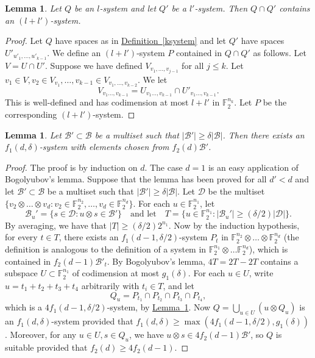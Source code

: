 \documentclass[11pt]{article}
\numberwithin{equation}{section}
\newtheorem{lemma}[theorem]{Lemma}
\theoremstyle{definition}
\theoremstyle{plain}
\newcommand{\expref}[2]{\hyperref[#2]{#1~\ref{#2}}}
\newcommand\F{\mathbb{F}}
\renewcommand\d{\delta}
\newcommand \cB{\mathcal B}
\newcommand \cD{\mathcal D}
\newcommand \s{\subset}
\begin{document}
\begin{lemma} \label{intersect}
	Let $Q$ be an $l$-system and let $Q'$ be a $l'$-system. Then $Q\cap Q'$ contains an $(l+l')$-system.
\end{lemma}

\begin{proof}
	Let $Q$ have spaces as in \expref{Definition}{ksystem} and let $Q'$ have spaces $U'_{u'_1,\dots,u'_{k-1}}$.
	We define an $(l+l')$-system $P$ contained in $Q\cap Q'$ as follows. Let $V=U\cap U'$. Suppose we have defined $V_{v_1,\dots,v_{j-1}}$ for all $j\leq k$. Let $v_1\in V,v_2\in V_{v_1},\dots,v_{k-1}\in V_{v_1,\dots,v_{k-2}}$.  We let \[
          V_{v_1\dots,v_{k-1}}=U_{v_1\dots,v_{k-1}}\cap U'_{v_1\dots,v_{k-1}}.
        \]
        This is well-defined and has codimension at most $l+l'$ in
        $\F_2^{n_k}$. Let $P$ be the corresponding $(l+l')$-system.
\end{proof}

\begin{lemma} \label{findsystem}
	Let $\cB'\subset \cB$ be a multiset such that $|\cB'|\geq \delta |\cB|$. Then there exists an $f_1(d,\d)$-system with elements chosen from $f_2(d)\cB'$.
\end{lemma}

\begin{proof}
  The proof is by induction on $d$. The case $d=1$ is an easy application of Bogolyubov's lemma. Suppose that the lemma has been proved for all $d'<d$ and let $\cB'\subset \cB$ be a multiset such that $|\cB'|\geq \delta |\cB|$. Let $\cD$ be the multiset $\{v_2\otimes\dots\otimes v_d: v_2\in \F_2^{n_2},\dots,v_d\in \F_2^{n_d}\}$. For each $u\in \F_2^{n_1}$, let \[
    \cB_u'=\{s\in \cD: u\otimes s\in \cB'\}\quad\text{and let}\quad T=\{u\in \F_2^{n_1}: |\cB_u'|\geq ({\delta}/{2})|\cD| \}.
  \]
  By averaging, we have that $|T|\geq ({\delta}/{2}) 2^{n_1}$. Now by
  the induction hypothesis, for every $t\in T$, there exists an
  $f_1(d-1,\d/2)$-system $P_t$ in
  $\F_2^{n_2}\otimes \dots \otimes \F_2^{n_d}$ (the definition is
  analogous to the definition of a system in
  $\F_2^{n_1}\otimes \dots \F_2^{n_d}$), which is contained in
  $f_2(d-1)\cB'_t$. By Bogolyubov's lemma, $4T=2T-2T$ contains a
  subspace $U\s \F_2^{n_1}$ of codimension at most $g_1(\d)$. For each
  $u\in U$, write $u=t_1+t_2+t_3+t_4$ arbitrarily with $t_i\in T$, and
  let
  \[
    Q_u=P_{t_1}\cap P_{t_2}\cap P_{t_3}\cap P_{t_4},
  \]
  which is a $4f_1(d-1,\d/2)$-system, by
  \expref{Lemma}{intersect}. Now $Q=\bigcup_{u\in U} (u\otimes Q_u)$
  is an $f_1(d,\d)$-system provided that
  $f_1(d,\d)\geq \max(4f_1(d-1,\d/2),g_1(\d))$. Moreover, for any
  $u\in U,s\in Q_u$, we have $u\otimes s\in 4f_2(d-1)\cB'$, so $Q$ is
  suitable provided that $f_2(d)\geq 4f_2(d-1)$.
\end{proof}
\end{document}
